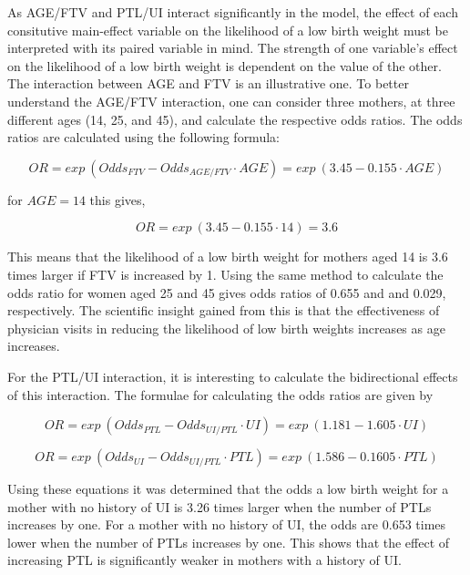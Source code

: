 As AGE/FTV and PTL/UI interact significantly in the model, the effect of each consitutive main-effect variable on the likelihood of a low birth weight must be interpreted with its paired variable in mind. The strength of one variable’s effect on the likelihood of a low birth weight is dependent on the value of the other. The interaction between AGE and FTV is an illustrative one. To better understand the AGE/FTV interaction, one can consider three mothers, at three different ages (14, 25, and 45), and calculate the respective odds ratios. The odds ratios are calculated using the following formula:

\begin{equation}
    OR = exp\:(Odds_{FTV} - Odds_{AGE/FTV}\cdot AGE) = exp\:(3.45 - 0.155\cdot AGE)
\end{equation}

for $AGE = 14$ this gives,

\begin{equation}
    OR = exp\:(3.45 - 0.155\cdot 14) = 3.6
\end{equation}

This means that the likelihood of a low birth weight for mothers aged 14 is 3.6 times larger if FTV is increased by 1.
Using the same method to calculate the odds ratio for women aged 25 and 45 gives odds ratios of 0.655 and and 0.029, respectively. The scientific insight gained from this is that the effectiveness of physician visits in reducing the likelihood of low birth weights increases as age increases.

For the PTL/UI interaction, it is interesting to calculate the bidirectional effects of this interaction. The formulae for calculating the odds ratios are given by

\begin{equation}
    OR = exp\:(Odds_{PTL} - Odds_{UI/PTL}\cdot UI) = exp\:(1.181 - 1.605\cdot UI)
\end{equation}

\begin{equation}
    OR = exp\:(Odds_{UI} - Odds_{UI/PTL}\cdot PTL) = exp\:(1.586 - 0.1605\cdot PTL)
\end{equation}

Using these equations it was determined that the odds a low birth weight for a mother with no history of UI is 3.26 times larger when the number of PTLs increases by one. For a mother with no history of UI, the odds are 0.653 times lower when the number of PTLs increases by one. This shows that the effect of increasing PTL is significantly weaker in mothers with a history of UI. 

